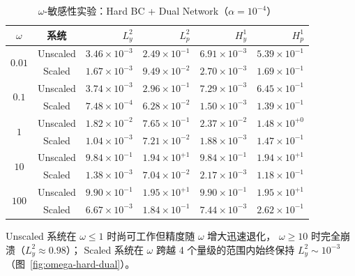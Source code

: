 \begin{table}[H]
  \centering
  \caption{$\omega$-敏感性实验：Hard BC + Dual Network（$\alpha=10^{-4}$）}
  \label{tab:omega-hard-dual}
  \small
  \begin{tabular}{cc rrrr}
    \toprule
    $\omega$ & 系统 & $L^2_y$ & $L^2_p$ & $H^1_y$ & $H^1_p$ \\
    \midrule
    \multirow{2}{*}{$0.01$}
      & Unscaled & $3.46\times10^{-3}$ & $2.49\times10^{-1}$
                 & $6.91\times10^{-3}$ & $5.39\times10^{-1}$ \\
      & Scaled   & $1.67\times10^{-3}$ & $9.49\times10^{-2}$
                 & $2.70\times10^{-3}$ & $1.69\times10^{-1}$ \\
    \midrule
    \multirow{2}{*}{$0.1$}
      & Unscaled & $3.74\times10^{-3}$ & $2.96\times10^{-1}$
                 & $7.29\times10^{-3}$ & $6.45\times10^{-1}$ \\
      & Scaled   & $7.48\times10^{-4}$ & $6.28\times10^{-2}$
                 & $1.50\times10^{-3}$ & $1.39\times10^{-1}$ \\
    \midrule
    \multirow{2}{*}{$1$}
      & Unscaled & $1.82\times10^{-2}$ & $7.65\times10^{-1}$
                 & $2.37\times10^{-2}$ & $1.48\times10^{+0}$ \\
      & Scaled   & $1.04\times10^{-3}$ & $7.21\times10^{-2}$
                 & $1.88\times10^{-3}$ & $1.47\times10^{-1}$ \\
    \midrule
    \multirow{2}{*}{$10$}
      & Unscaled & $9.84\times10^{-1}$ & $1.94\times10^{+1}$
                 & $9.84\times10^{-1}$ & $1.94\times10^{+1}$ \\
      & Scaled   & $1.38\times10^{-3}$ & $7.04\times10^{-2}$
                 & $2.17\times10^{-3}$ & $1.18\times10^{-1}$ \\
    \midrule
    \multirow{2}{*}{$100$}
      & Unscaled & $9.90\times10^{-1}$ & $1.95\times10^{+1}$
                 & $9.90\times10^{-1}$ & $1.95\times10^{+1}$ \\
      & Scaled   & $6.67\times10^{-3}$ & $1.84\times10^{-1}$
                 & $7.44\times10^{-3}$ & $2.62\times10^{-1}$ \\
    \bottomrule
  \end{tabular}
\end{table}

Unscaled 系统在 $\omega \leq 1$ 时尚可工作但精度随 $\omega$ 增大迅速退化，
$\omega \geq 10$ 时完全崩溃（$L^2_y \approx 0.98$）；
Scaled 系统在 $\omega$ 跨越 4 个量级的范围内始终保持
$L^2_y \sim 10^{-3}$（图~\ref{fig:omega-hard-dual}）。

